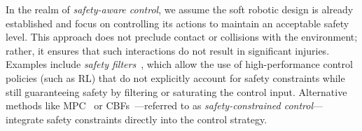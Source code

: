 In the realm of \emph{safety-aware control}, we assume the soft robotic design is already established and focus on controlling its actions to maintain an acceptable safety level. This approach does not preclude contact or collisions with the environment; rather, it ensures that such interactions do not result in significant injuries. Examples include \emph{safety filters}~\citep{bertino2023prescribed}, which allow the use of high-performance control policies (such as \gls{RL}) that do not explicitly account for safety constraints while still guaranteeing safety by filtering or saturating the control input. Alternative methods like \gls{MPC}~\citep{hewing2020learning} or \glspl{CBF}~\citep{ames2016control, ferraguti2020control}—referred to as \emph{safety-constrained control}—integrate safety constraints directly into the control strategy.

